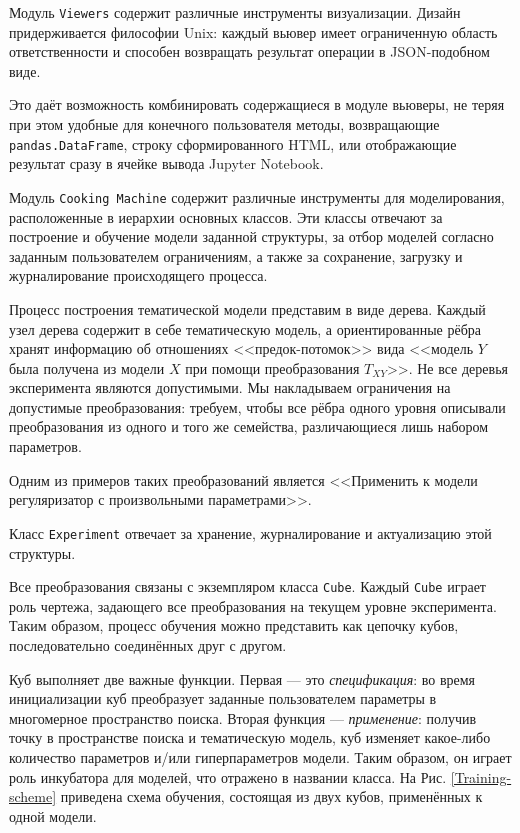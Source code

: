 Модуль \texttt{Viewers} содержит различные инструменты визуализации. Дизайн придерживается философии Unix: каждый вьювер имеет ограниченную область ответственности и способен возвращать результат операции в JSON-подобном виде.

Это даёт возможность комбинировать содержащиеся в модуле вьюверы, не теряя при этом удобные для конечного пользователя методы, возвращающие \texttt{pandas.DataFrame}, строку сформированного HTML, или отображающие результат сразу в ячейке вывода Jupyter Notebook. 

Модуль \texttt{Cooking Machine} содержит различные инструменты для моделирования, расположенные в иерархии основных классов. Эти классы отвечают за построение и обучение модели заданной структуры, за отбор моделей согласно заданным пользователем ограничениям, а также за сохранение, загрузку и журналирование происходящего процесса.

Процесс построения тематической модели представим в виде дерева. Каждый узел дерева содержит в себе тематическую модель, а ориентированные рёбра хранят информацию об отношениях <<предок-потомок>> вида <<модель $Y$ была получена из модели $X$ при помощи преобразования $T_{XY}$>>. Не все деревья эксперимента являются допустимыми. Мы накладываем ограничения на допустимые преобразования: требуем, чтобы все рёбра одного уровня описывали преобразования из одного и того же семейства, различающиеся лишь набором параметров. 

Одним из примеров таких преобразований является <<Применить к модели регуляризатор с произвольными параметрами>>. 

Класс \texttt{Experiment} отвечает за хранение, журналирование и актуализацию этой структуры.  

Все преобразования связаны с экземпляром класса \texttt{Cube}. Каждый \texttt{Cube} играет роль чертежа, задающего все преобразования на текущем уровне эксперимента. Таким образом, процесс обучения можно представить как цепочку кубов, последовательно соединённых друг с другом.  

Куб выполняет две важные функции. Первая --- это \textit{спецификация}: во время инициализации куб преобразует заданные пользователем параметры в многомерное пространство поиска. Вторая функция --- \textit{применение}: получив точку в пространстве поиска и тематическую модель, куб изменяет какое-либо количество параметров и/или гиперпараметров модели. Таким образом, он играет роль инкубатора для моделей, что отражено в названии класса. На Рис.  \ref{Training-scheme} приведена схема обучения, состоящая из двух кубов, применённых к одной модели.  


